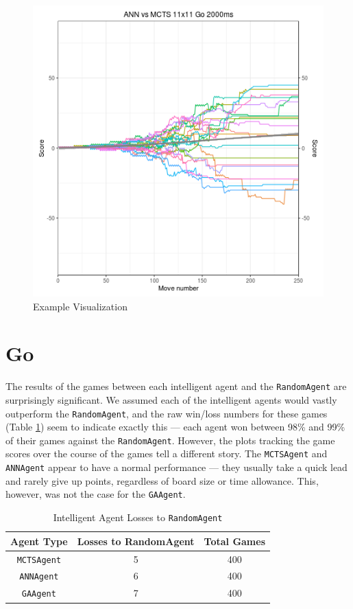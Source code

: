 \begin{figure}[h]
  \centering
  \includegraphics[scale=0.6]{images/Visualizations/ANNvsMCTS/2000ms11x11.png}
  \caption{Example Visualization}
  \label{fig:ex}
\end{figure}
  

\section{Go}
The results of the games between each intelligent agent and the \texttt{RandomAgent} are surprisingly significant.  We assumed each of the intelligent agents would vastly outperform the \texttt{RandomAgent}, and the raw win/loss numbers for these games (Table \ref{tab:ranloss}) seem to indicate exactly this --- each agent won between 98\% and 99\% of their games against the \texttt{RandomAgent}.  However, the plots tracking the game scores over the course of the games tell a different story.  The \texttt{MCTSAgent} and \texttt{ANNAgent} appear to have a normal performance --- they usually take a quick lead and rarely give up points, regardless of board size or time allowance.  This, however, was not the case for the \texttt{GAAgent}.

\begin{table}
\centering
\begin{tabular}{|c|c|c|}
\hline
\textbf{Agent Type} & \textbf{Losses to RandomAgent} & \textbf{Total Games}\\ \hline\hline
\texttt{MCTSAgent} & 5 & 400\\ \hline
\texttt{ANNAgent} & 6 & 400\\ \hline
\texttt{GAAgent} & 7 & 400\\ \hline
\end{tabular}
\caption{Intelligent Agent Losses to \texttt{RandomAgent}}
\label{tab:ranloss}
\end{table}

